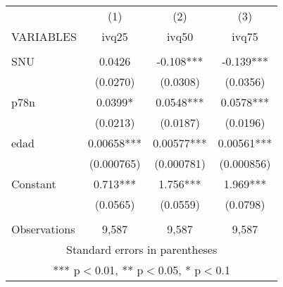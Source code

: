 \begin{tabular}{lccc} \hline
 & (1) & (2) & (3) \\
VARIABLES & ivq25 & ivq50 & ivq75 \\ \hline
 &  &  &  \\
SNU & 0.0426 & -0.108*** & -0.139*** \\
 & (0.0270) & (0.0308) & (0.0356) \\
p78n & 0.0399* & 0.0548*** & 0.0578*** \\
 & (0.0213) & (0.0187) & (0.0196) \\
edad & 0.00658*** & 0.00577*** & 0.00561*** \\
 & (0.000765) & (0.000781) & (0.000856) \\
Constant & 0.713*** & 1.756*** & 1.969*** \\
 & (0.0565) & (0.0559) & (0.0798) \\
 &  &  &  \\
 Observations & 9,587 & 9,587 & 9,587 \\ \hline
\multicolumn{4}{c}{ Standard errors in parentheses} \\
\multicolumn{4}{c}{ *** p$<$0.01, ** p$<$0.05, * p$<$0.1} \\
\end{tabular}
